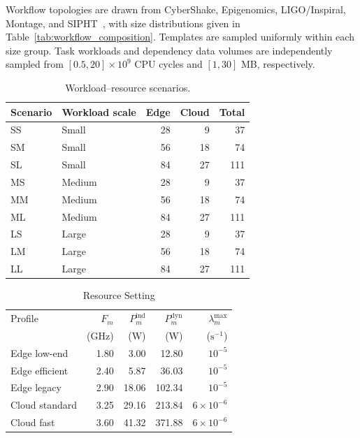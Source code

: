 \documentclass[journal]{IEEEtran}
\begin{document}
Workflow topologies are drawn from CyberShake, Epigenomics, LIGO/Inspiral, Montage, and SIPHT~\cite{juve2013workflows}, with size distributions given in Table~\ref{tab:workflow_composition}. Templates are sampled uniformly within each size group. Task workloads and dependency data volumes are independently sampled from $[0.5,20]\times10^9$ CPU cycles and $[1,30]$ MB, respectively.

\begin{table}[t]
\centering
\caption{Workload--resource scenarios.}
\label{tab:experiment_scenarios}
\footnotesize
\setlength{\tabcolsep}{5pt}
\renewcommand{\arraystretch}{1.08}
\begin{tabular}{@{}llrrr@{}}
\toprule
Scenario & Workload scale & Edge & Cloud & Total \\
\midrule
SS & Small  & 28 &  9 &  37 \\
SM & Small  & 56 & 18 &  74 \\
SL & Small  & 84 & 27 & 111 \\
\midrule
MS & Medium & 28 &  9 &  37 \\
MM & Medium & 56 & 18 &  74 \\
ML & Medium & 84 & 27 & 111 \\
\midrule
LS & Large  & 28 &  9 &  37 \\
LM & Large  & 56 & 18 &  74 \\
LL & Large  & 84 & 27 & 111 \\
\bottomrule
\end{tabular}
\end{table}

\begin{table}[t]
\centering
\caption{Resource Setting}
\label{tab:server_profiles}
\footnotesize
\setlength{\tabcolsep}{5pt}
\renewcommand{\arraystretch}{1.08}
\begin{tabular}{@{}lrrrr@{}}
\toprule
Profile & $F_m$ & $P_m^{\mathrm{ind}}$ & $P_m^{\mathrm{dyn}}$ & $\lambda_m^{\max}$ \\
& (GHz) & (W) & (W) & ($\mathrm{s}^{-1}$) \\
\midrule
Edge low-end   & 1.80 &  3.00 &  12.80 & $10^{-5}$ \\
Edge efficient & 2.40 &  5.87 &  36.03 & $10^{-5}$ \\
Edge legacy    & 2.90 & 18.06 & 102.34 & $10^{-5}$ \\
Cloud standard & 3.25 & 29.16 & 213.84 & $6\times10^{-6}$ \\
Cloud fast     & 3.60 & 41.32 & 371.88 & $6\times10^{-6}$ \\
\bottomrule
\end{tabular}
\end{table}
\end{document}
